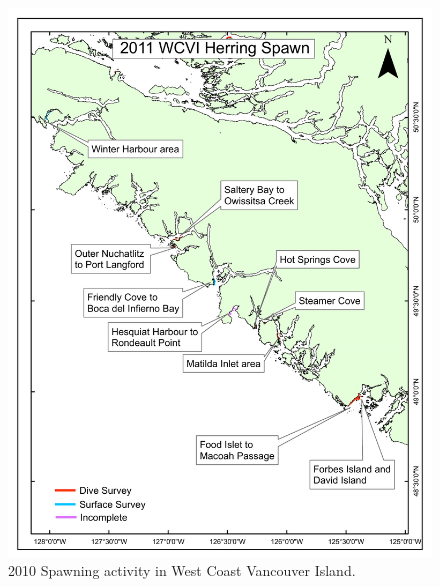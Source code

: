 \begin{frame}[t]
{\begin{figure}[htbp]
		\includegraphics[scale=0.23]
		{../FIGS/PBSfigs/2011_spawn_WCVI_August16}
		\caption{2010 Spawning activity in West Coast Vancouver Island.}
	\end{figure}
	}
\end{frame}
%
